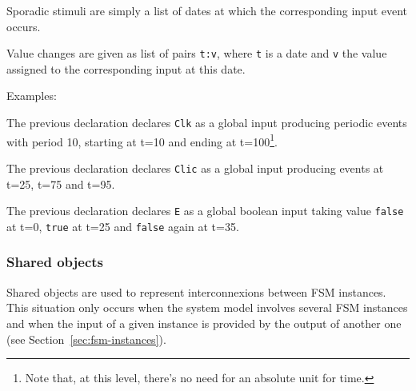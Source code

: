 Sporadic stimuli
are simply a list of dates at which the corresponding input event occurs.

\begin{center}
\end{center}

Value changes are given as
list of pairs \verb|t:v|, where \verb|t| is a date and \verb|v| the value assigned to the
corresponding input at this date. 

\begin{center}
\end{center}

\medskip
Examples:

\begin{center}
\end{center}

The previous declaration declares \verb|Clk| as a global input producing periodic events with period 10, starting
  at t=10 and ending at t=100\footnote{Note that, at this level, there's no need for an absolute
    unit for time.}.

\begin{center}
\end{center}

The previous declaration declares \verb|Clic| as a global input producing events at t=25, t=75 and
  t=95.

\begin{center}
\end{center}

The previous declaration declares \verb|E| as a global boolean input taking value \texttt{false} at
t=0, \texttt{true} at t=25 and \texttt{false} again at t=35.

\subsubsection*{Shared objects}
\label{sec:shared}

Shared objects are used to represent interconnexions between FSM instances. This situation only
occurs when the system model involves several FSM instances and when the input of a given instance
is provided by the output of another one (see Section~\ref{sec:fsm-instances}).

